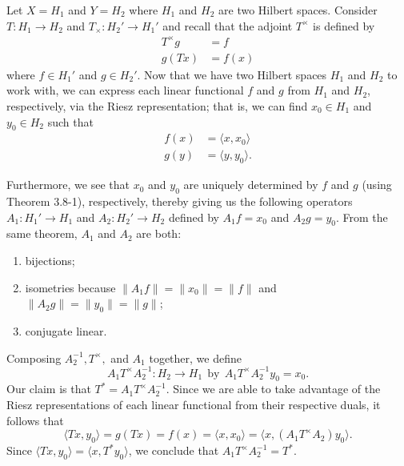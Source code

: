 Let \( X = {H}_{1} \) and \( Y = {H}_{2} \) where \( {H}_{1} \) and \( {H}_{2} \) are two Hilbert spaces. Consider \( T: {H}_{1} \to {H}_{2} \) and \( {T}_{\times}: {H}_{2}' \to {H}_{1}' \) and recall that the adjoint \( T^{\times} \) is defined by 
\begin{align*}
    T^{\times} g &= f \tag{a} \\
    g(Tx) &= f(x) \tag{b}
\end{align*}
where \( f \in {H}_{1}' \) and \( g \in {H}_{2}' \).  Now that we have two Hilbert spaces \( {H}_{1} \) and \( {H}_{2} \) to work with, we can express each linear functional \( f  \) and \( g  \) from \( {H}_{1} \) and \( {H}_{2} \), respectively, via the Riesz representation; that is, we can find \( {x}_{0} \in {H}_{1} \) and \( {y}_{0} \in {H}_{2} \) such that  
\begin{align*}
    f(x) &= \langle x , {x}_{0} \rangle \\
    g(y) &= \langle y , {y}_{0} \rangle.
\end{align*}

Furthermore, we see that \( {x}_{0} \) and \( {y}_{0}  \) are uniquely determined by \( f  \) and \( g  \) (using Theorem 3.8-1), respectively, thereby giving us the following operators \( {A}_{1} : {H}_{1}' \to {H}_{1} \) and \( {A}_{2} : {H}_{2}' \to {H}_{2} \) defined by \( {A}_{1} f = {x}_{0} \) and \( {A}_{2} g = {y}_{0} \). From the same theorem, \( {A}_{1} \) and \( {A}_{2} \) are both:
\begin{enumerate}
    \item[(a)] bijections;
    \item[(b)] isometries because \( \|{A}_{1}f\| = \|{x}_{0}\| = \|f\| \) and \( \|{A}_{2}g\| = \|{y}_{0}\| = \|g\| \);
    \item[(c)] conjugate linear.
\end{enumerate}
Composing \( {A}_{2}^{-1}, T^{\times},   \) and \( {A}_{1} \) together, we define
\[ {A}_{1} T^{\times} {A}_{2}^{-1} : {H}_{2} \to {H}_{1} \ \ \text{by} \ \ {A}_{1}T^{\times} {A}_{2}^{-1} {y}_{0} = {x}_{0}. \]
Our claim is that \( T^{*} = {A}_{1} T^{\times} {A}_{2}^{-1} \). Since we are able to take advantage of the Riesz representations of each linear functional from their respective duals, it follows that 
\[  \langle Tx , {y}_{0} \rangle = g(Tx) = f(x) = \langle x , {x}_{0} \rangle = \langle x  ,  ({A}_{1} T^{\times} {A}_{2} )  {y}_{0} \rangle. \]
Since \( \langle Tx  , {y}_{0} \rangle = \langle x  , T^{*} {y}_{0} \rangle \), we conclude that \( {A}_{1} T^{\times} {A}_{2}^{-1} = T^{*} \).

